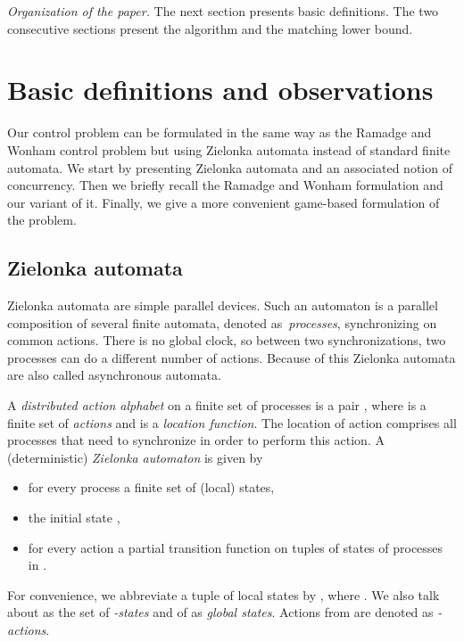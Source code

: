 \documentclass{llncs}
\begin{document}
\medskip

 \noindent\textit{Organization of the paper.} 
 The next section presents basic definitions. 
 The two consecutive sections present the algorithm and the matching
 lower bound. 




\section{Basic definitions and observations}
Our control problem can be formulated in the same way as the Ramadge
and Wonham control problem but using Zielonka automata instead of
standard finite automata. We start by presenting Zielonka automata and
an associated notion of concurrency. Then we briefly recall the
Ramadge and Wonham formulation and our variant of it. Finally, we give
a more convenient game-based formulation of the problem.


\subsection{Zielonka automata}

Zielonka automata are simple parallel devices. Such an
automaton is a parallel
composition of several finite automata, denoted as~\emph{processes},
synchronizing on common actions. There is no global clock, so between
two synchronizations, two processes can do a different number of
actions. Because of this Zielonka automata are also called
asynchronous automata.

A \emph{distributed action alphabet} on a finite set  of processes is a
pair , where  is a finite set of \emph{actions} and
 is a \emph{location
  function}. The location  of action  comprises all
processes  that need to synchronize in order to perform this
action. 
A (deterministic) \emph{Zielonka automaton}
 is
given by 
\begin{itemize}
\item for every process  a finite set  of (local) states,
\item the initial state , 
\item for every action   a partial transition function
 on tuples of states of processes in
  . 
\end{itemize}

For convenience, we abbreviate a tuple  of local
states by  ,  where . We also talk about 
as the set of \emph{-states} and of  as
\emph{global states}. Actions from  are denoted as \emph{-actions}.
\end{document}
